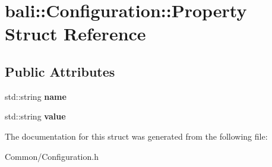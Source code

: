 \hypertarget{structbali_1_1_configuration_1_1_property}{\section{bali\-:\-:Configuration\-:\-:Property Struct Reference}
\label{structbali_1_1_configuration_1_1_property}
}
\subsection*{Public Attributes}
\begin{DoxyCompactItemize}
\item 
\hypertarget{structbali_1_1_configuration_1_1_property_a81374993b02ed778134ff7474e62a4b0}{std\-::string {\bfseries name}}\label{structbali_1_1_configuration_1_1_property_a81374993b02ed778134ff7474e62a4b0}

\item 
\hypertarget{structbali_1_1_configuration_1_1_property_a9b16d13f06ebf8ee8a8d7e758177ddf5}{std\-::string {\bfseries value}}\label{structbali_1_1_configuration_1_1_property_a9b16d13f06ebf8ee8a8d7e758177ddf5}

\end{DoxyCompactItemize}


The documentation for this struct was generated from the following file\-:\begin{DoxyCompactItemize}
\item 
Common/Configuration.\-h\end{DoxyCompactItemize}
